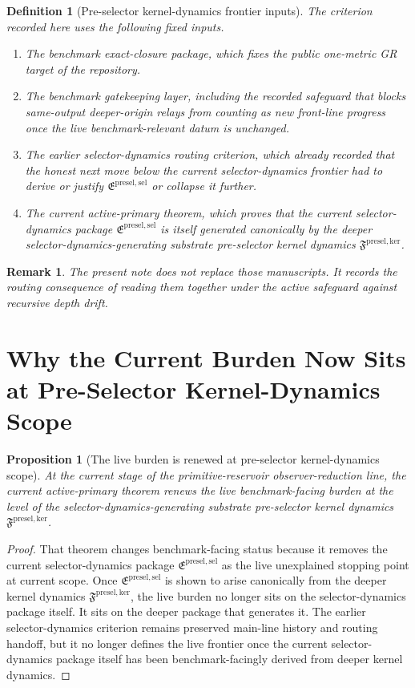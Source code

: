 \documentclass[11pt]{article}
\newcommand{\KernelPackage}{\mathfrak F^{\mathrm{presel,ker}}}
\newcommand{\PreSectionSelectorPackage}{\mathfrak E^{\mathrm{presel,sel}}}
\newtheorem{definition}{Definition}
\newtheorem{proposition}{Proposition}
\newtheorem{remark}{Remark}
\begin{document}
\begin{definition}[Pre-selector kernel-dynamics frontier inputs]
The criterion recorded here uses the following fixed inputs.
\begin{enumerate}
    \item The benchmark exact-closure package, which fixes the public one-metric GR target of the repository.
    \item The benchmark gatekeeping layer, including the recorded safeguard that blocks same-output deeper-origin relays from counting as new front-line progress once the live benchmark-relevant datum is unchanged.
    \item The earlier selector-dynamics routing criterion, which already recorded that the honest next move below the current selector-dynamics frontier had to derive or justify \(\PreSectionSelectorPackage\) or collapse it further.
    \item The current active-primary theorem, which proves that the current selector-dynamics package \(\PreSectionSelectorPackage\) is itself generated canonically by the deeper selector-dynamics-generating substrate pre-selector kernel dynamics \(\KernelPackage\).
\end{enumerate}
\end{definition}

\begin{remark}
The present note does not replace those manuscripts. It records the routing consequence of reading them together under the active safeguard against recursive depth drift.
\end{remark}

\section{Why the Current Burden Now Sits at Pre-Selector Kernel-Dynamics Scope}

\begin{proposition}[The live burden is renewed at pre-selector kernel-dynamics scope]
At the current stage of the primitive-reservoir observer-reduction line, the current active-primary theorem renews the live benchmark-facing burden at the level of the selector-dynamics-generating substrate pre-selector kernel dynamics \(\KernelPackage\).
\end{proposition}

\begin{proof}
That theorem changes benchmark-facing status because it removes the current selector-dynamics package \(\PreSectionSelectorPackage\) as the live unexplained stopping point at current scope. Once \(\PreSectionSelectorPackage\) is shown to arise canonically from the deeper kernel dynamics \(\KernelPackage\), the live burden no longer sits on the selector-dynamics package itself. It sits on the deeper package that generates it. The earlier selector-dynamics criterion remains preserved main-line history and routing handoff, but it no longer defines the live frontier once the current selector-dynamics package itself has been benchmark-facingly derived from deeper kernel dynamics.
\end{proof}
\end{document}
